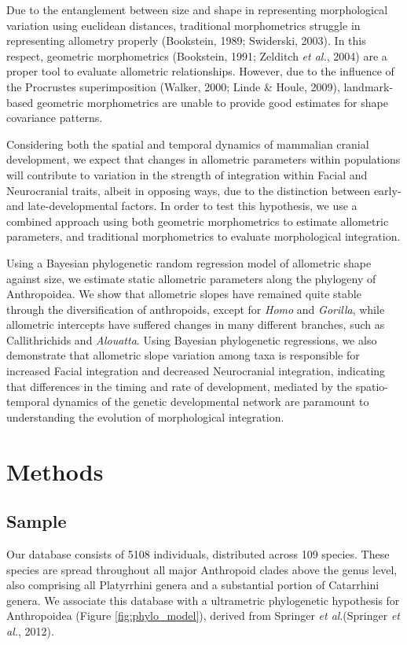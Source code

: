 \documentclass[12pt,]{article}
\begin{document}
Due to the entanglement between size and shape in representing
morphological variation using euclidean distances, traditional
morphometrics struggle in representing allometry properly (Bookstein,
1989; Swiderski, 2003). In this respect, geometric morphometrics
(Bookstein, 1991; Zelditch \emph{et al.}, 2004) are a proper tool to
evaluate allometric relationships. However, due to the influence of the
Procrustes superimposition (Walker, 2000; Linde \& Houle, 2009),
landmark-based geometric morphometrics are unable to provide good
estimates for shape covariance patterns.

Considering both the spatial and temporal dynamics of mammalian cranial
development, we expect that changes in allometric parameters within
populations will contribute to variation in the strength of integration
within Facial and Neurocranial traits, albeit in opposing ways, due to
the distinction between early- and late-developmental factors. In order
to test this hypothesis, we use a combined approach using both geometric
morphometrics to estimate allometric parameters, and traditional
morphometrics to evaluate morphological integration.

Using a Bayesian phylogenetic random regression model of allometric
shape against size, we estimate static allometric parameters along the
phylogeny of Anthropoidea. We show that allometric slopes have remained
quite stable through the diversification of anthropoids, except for
\emph{Homo} and \emph{Gorilla}, while allometric intercepts have
suffered changes in many different branches, such as Callithrichids and
\emph{Alouatta}. Using Bayesian phylogenetic regressions, we also
demonstrate that allometric slope variation among taxa is responsible
for increased Facial integration and decreased Neurocranial integration,
indicating that differences in the timing and rate of development,
mediated by the spatio-temporal dynamics of the genetic developmental
network are paramount to understanding the evolution of morphological
integration.

\section{Methods}\label{methods}

\subsection{Sample}\label{sample}

Our database consists of 5108 individuals, distributed across 109
species. These species are spread throughout all major Anthropoid clades
above the genus level, also comprising all Platyrrhini genera and a
substantial portion of Catarrhini genera. We associate this database
with a ultrametric phylogenetic hypothesis for Anthropoidea (Figure
\ref{fig:phylo_model}), derived from Springer \emph{et al}.(Springer
\emph{et al.}, 2012).
\end{document}
